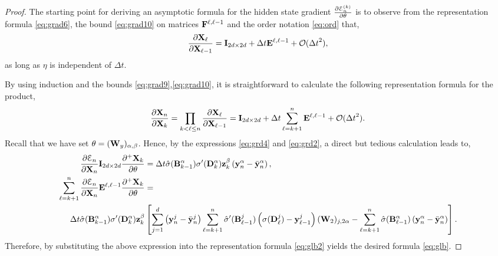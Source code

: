 \documentclass{article} \usepackage{iclr2022_conference,times}
\newcommand{\by}{{\bf y}}
\newcommand{\bz}{{\bf z}}
\newcommand{\bW}{{\bf W}}
\newcommand{\bX}{{\bf X}}
\newcommand{\bB}{{\bf B}}
\newcommand{\ord}{{\mathcal O}}
\newcommand{\Dt}{{\Delta t}}
\newcommand{\E}{\EuScript{E}}
\newcommand{\bF}{{\bf F}}
\newcommand{\bD}{{\bf D}}
\newcommand{\bE}{{\bf E}}
\begin{document}
\begin{proof}
The starting point for deriving an asymptotic formula for the hidden state gradient $\frac{\partial \E^{(k)}_n}{\partial \theta}$ is to observe from the representation formula \eqref{eq:grad6}, the bound \eqref{eq:grad10} on matrices $\bF^{\ell,\ell-1}$ and the order notation \eqref{eq:ord} that,
\begin{equation}
    \label{eq:glb1}
    \frac{\partial \bX_\ell}{\partial \bX_{\ell-1}} = {\bf I}_{2d \times 2d} + \Dt \bE^{\ell,\ell-1} + \ord(\Dt^2),
\end{equation}
as long as $\eta$ is independent of $\Dt$.

By using induction and the bounds \eqref{eq:grad9},\eqref{eq:grad10}, it is straightforward to calculate the following representation formula for the product, 
\begin{equation}
    \label{eq:glb2}
    \frac{\partial \bX_n}{\partial \bX_k} = \prod\limits_{k < \ell \leq n} \frac{\partial \bX_\ell}{\partial \bX_{\ell-1}} = {\bf I}_{2d \times 2d} + \Dt \sum\limits_{\ell=k+1}^n \bE^{\ell,\ell-1} + \ord(\Dt^2).
\end{equation}
Recall that we have set $\theta = (\bW_y)_{\alpha,\beta}$. Hence, by the expressions \eqref{eq:grd4} and \eqref{eq:grd2}, a direct but tedious calculation leads to,
\begin{align}
\label{eq:glb3}
    \frac{\partial \E_n}{\partial \bX_n} {\bf I}_{2d \times 2d}\frac{\partial^{+} \bX_k}{\partial \theta} &= \Dt \hat{\sigma}(\bB^\alpha_{k-1})\sigma^{\prime}(\bD^\alpha_{k})\bz^\beta_{k}\left(\by^{\alpha}_n - \bar{\by}^\alpha_n\right), \\
    \sum\limits_{\ell=k+1}^n \frac{\partial \E_n}{\partial \bX_n} \bE^{\ell,\ell-1} \frac{\partial^{+} \bX_k}{\partial \theta}&=\\
    \Dt \hat{\sigma}(\bB^\alpha_{k-1})\sigma^{\prime}(\bD^\alpha_{k})\bz^\beta_{k}
    &\left[\sum\limits_{j=1}^d \left(\by_n^{j} - \bar{\by}_n^j\right)\sum\limits_{\ell=k+1}^n\hat{\sigma}^{\prime}(\bB^j_{\ell-1})\left(\sigma(\bD^j_{\ell}) - \by^j_{\ell-1}\right)(\bW_2)_{j,2\alpha} - \sum\limits_{\ell=k+1}^n \hat{\sigma}(\bB^{\alpha}_{\ell-1})\left(\by_n^{\alpha} - \bar{\by}_n^{\alpha}\right)\right] .
\end{align}
Therefore, by substituting the above expression into the representation formula \eqref{eq:glb2} yields the desired formula \eqref{eq:glb}.


\end{proof}
\end{document}

